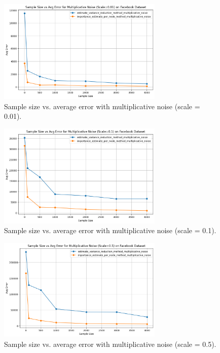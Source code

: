 \documentclass[11pt]{article}
\begin{document}
\begin{figure}[h!]
    \centering
    \includegraphics[width=0.7\textwidth]{plots/simulated/percent_error_vs_sample_size_comparison_multiplicative_0.01.png}
    \caption{Sample size vs. average error with multiplicative noise (scale = 0.01).}
    \label{fig:multiplicative_noise_001}
\end{figure}

\begin{figure}[h!]
    \centering
    \includegraphics[width=0.7\textwidth]{plots/simulated/percent_error_vs_sample_size_comparison_multiplicative_0.1.png}
    \caption{Sample size vs. average error with multiplicative noise (scale = 0.1).}
    \label{fig:multiplicative_noise_01}
\end{figure}

\begin{figure}[h!]
    \centering
    \includegraphics[width=0.7\textwidth]{plots/simulated/percent_error_vs_sample_size_comparison_multiplicative_0.5.png}
    \caption{Sample size vs. average error with multiplicative noise (scale = 0.5).}
    \label{fig:multiplicative_noise_05}
\end{figure}
\end{document}
